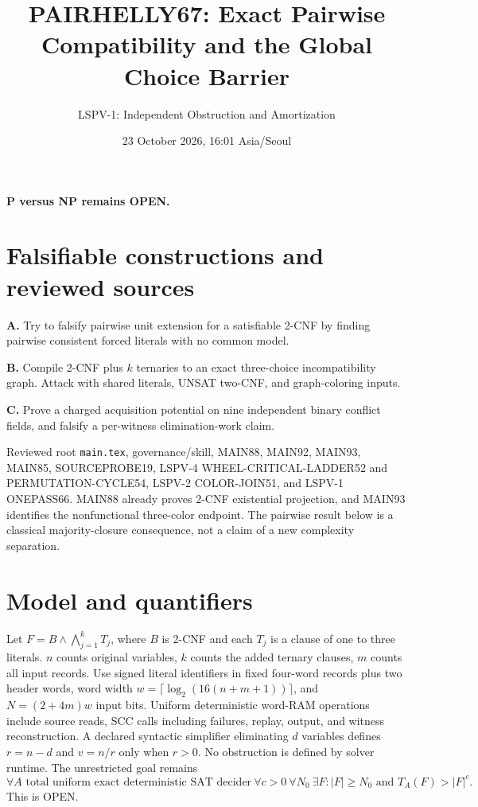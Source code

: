 \documentclass[10pt]{article}
\title{PAIRHELLY67: Exact Pairwise Compatibility and the Global Choice Barrier}
\author{LSPV-1: Independent Obstruction and Amortization}
\date{23 October 2026, 16:01 Asia/Seoul}
\begin{document}
\maketitle
\begin{center}\textbf{P versus NP remains OPEN.}\end{center}

\section{Falsifiable constructions and reviewed sources}
\noindent\textbf{A.} Try to falsify pairwise unit extension for a satisfiable 2-CNF by finding pairwise consistent forced literals with no common model.
\par\noindent\textbf{B.} Compile 2-CNF plus $k$ ternaries to an exact three-choice incompatibility graph. Attack with shared literals, UNSAT two-CNF, and graph-coloring inputs.
\par\noindent\textbf{C.} Prove a charged acquisition potential on nine independent binary conflict fields, and falsify a per-witness elimination-work claim.
\par
Reviewed root \texttt{main.tex}, governance/skill, MAIN88, MAIN92, MAIN93, MAIN85, SOURCEPROBE19, LSPV-4 WHEEL-CRITICAL-LADDER52 and PERMUTATION-CYCLE54, LSPV-2 COLOR-JOIN51, and LSPV-1 ONEPASS66.
MAIN88 already proves 2-CNF existential projection, and MAIN93 identifies the nonfunctional three-color endpoint. The pairwise result below is a classical majority-closure consequence, not a claim of a new complexity separation.

\section{Model and quantifiers}
Let $F=B\land\bigwedge_{j=1}^k T_j$, where $B$ is 2-CNF and each $T_j$ is a clause of one to three literals. $n$ counts original variables, $k$ counts the added ternary clauses, $m$ counts all input records. Use signed literal identifiers in fixed four-word records plus two header words, word width $w=\lceil\log_2(16(n+m+1))\rceil$, and $N=(2+4m)w$ input bits. Uniform deterministic word-RAM operations include source reads, SCC calls including failures, replay, output, and witness reconstruction. A declared syntactic simplifier eliminating $d$ variables defines $r=n-d$ and $v=n/r$ only when $r>0$. No obstruction is defined by solver runtime. The unrestricted goal remains
\[
\forall A\text{ total uniform exact deterministic SAT decider}\ 
\forall c>0\ \forall N_0\ \exists F:
|F|\ge N_0\text{ and }T_A(F)>|F|^c.
\tag{U}
\]
This is OPEN.
\end{document}
